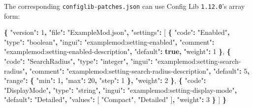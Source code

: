 \documentclass[
  11pt,
  letterpaper,
  titlepage]{article}
\newenvironment{Shaded}{\begin{snugshade}}{\end{snugshade}}
\newcommand{\DataTypeTok}[1]{\textcolor[rgb]{0.13,0.29,0.53}{#1}}
\newcommand{\DecValTok}[1]{\textcolor[rgb]{0.00,0.00,0.81}{#1}}
\newcommand{\FunctionTok}[1]{\textcolor[rgb]{0.13,0.29,0.53}{\textbf{#1}}}
\newcommand{\KeywordTok}[1]{\textcolor[rgb]{0.13,0.29,0.53}{\textbf{#1}}}
\newcommand{\OtherTok}[1]{\textcolor[rgb]{0.56,0.35,0.01}{#1}}
\newcommand{\StringTok}[1]{\textcolor[rgb]{0.31,0.60,0.02}{#1}}
\begin{document}
The corresponding \texttt{configlib-patches.json} can use Config Lib
\texttt{1.12.0}'s array form:

\begin{Shaded}
\begin{Highlighting}[]
\FunctionTok{\{}
  \DataTypeTok{"version"}\FunctionTok{:} \DecValTok{1}\FunctionTok{,}
  \DataTypeTok{"file"}\FunctionTok{:} \StringTok{"ExampleMod.json"}\FunctionTok{,}
  \DataTypeTok{"settings"}\FunctionTok{:} \OtherTok{[}
    \FunctionTok{\{}
      \DataTypeTok{"code"}\FunctionTok{:} \StringTok{"Enabled"}\FunctionTok{,}
      \DataTypeTok{"type"}\FunctionTok{:} \StringTok{"boolean"}\FunctionTok{,}
      \DataTypeTok{"ingui"}\FunctionTok{:} \StringTok{"examplemod:setting{-}enabled"}\FunctionTok{,}
      \DataTypeTok{"comment"}\FunctionTok{:} \StringTok{"examplemod:setting{-}enabled{-}description"}\FunctionTok{,}
      \DataTypeTok{"default"}\FunctionTok{:} \KeywordTok{true}\FunctionTok{,}
      \DataTypeTok{"weight"}\FunctionTok{:} \DecValTok{1}
    \FunctionTok{\}}\OtherTok{,}
    \FunctionTok{\{}
      \DataTypeTok{"code"}\FunctionTok{:} \StringTok{"SearchRadius"}\FunctionTok{,}
      \DataTypeTok{"type"}\FunctionTok{:} \StringTok{"integer"}\FunctionTok{,}
      \DataTypeTok{"ingui"}\FunctionTok{:} \StringTok{"examplemod:setting{-}search{-}radius"}\FunctionTok{,}
      \DataTypeTok{"comment"}\FunctionTok{:} \StringTok{"examplemod:setting{-}search{-}radius{-}description"}\FunctionTok{,}
      \DataTypeTok{"default"}\FunctionTok{:} \DecValTok{5}\FunctionTok{,}
      \DataTypeTok{"range"}\FunctionTok{:} \FunctionTok{\{}
        \DataTypeTok{"min"}\FunctionTok{:} \DecValTok{1}\FunctionTok{,}
        \DataTypeTok{"max"}\FunctionTok{:} \DecValTok{20}\FunctionTok{,}
        \DataTypeTok{"step"}\FunctionTok{:} \DecValTok{1}
      \FunctionTok{\},}
      \DataTypeTok{"weight"}\FunctionTok{:} \DecValTok{2}
    \FunctionTok{\}}\OtherTok{,}
    \FunctionTok{\{}
      \DataTypeTok{"code"}\FunctionTok{:} \StringTok{"DisplayMode"}\FunctionTok{,}
      \DataTypeTok{"type"}\FunctionTok{:} \StringTok{"string"}\FunctionTok{,}
      \DataTypeTok{"ingui"}\FunctionTok{:} \StringTok{"examplemod:setting{-}display{-}mode"}\FunctionTok{,}
      \DataTypeTok{"default"}\FunctionTok{:} \StringTok{"Detailed"}\FunctionTok{,}
      \DataTypeTok{"values"}\FunctionTok{:} \OtherTok{[}
        \StringTok{"Compact"}\OtherTok{,}
        \StringTok{"Detailed"}
      \OtherTok{]}\FunctionTok{,}
      \DataTypeTok{"weight"}\FunctionTok{:} \DecValTok{3}
    \FunctionTok{\}}
  \OtherTok{]}
\FunctionTok{\}}
\end{Highlighting}
\end{Shaded}
\end{document}
